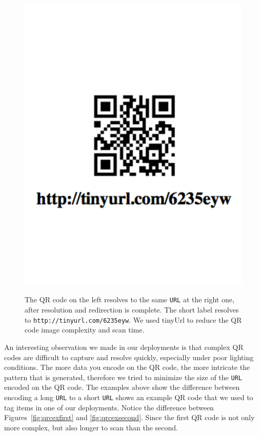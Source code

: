 \begin{figure}[htb!]
\begin{center}
{            \includegraphics[scale=0.35]{figs/qrcex}
        }
\end{center}
\caption{
	The QR code on the left resolves to the same {\tt URL} at the right one, after resolution and
	redirection is complete. 
	The short label resolves to {\tt http://tinyurl.com/6235eyw}.
	We used tinyUrl to reduce the QR code image complexity and scan time.
     }%
\end{figure}

An interesting observation we made in our deployments is that complex QR codes are difficult to capture and resolve
quickly, especially under poor lighting conditions.
The more data you encode on the QR code, the more 
intricate the pattern that is generated, therefore we tried to minimize the size of the {\tt URL} encoded on the QR code.  
The examples above show the difference between encoding a 
long %
{\tt URL} to a short {\tt URL} shows an %
example QR code that we used to tag items in one of our deployments.  Notice the difference between Figures~\ref{fig:qrcexfirst} 
and \ref{fig:qrcexsecond}.  Since the first QR code is not only more complex, but also longer to scan
than the second.  

